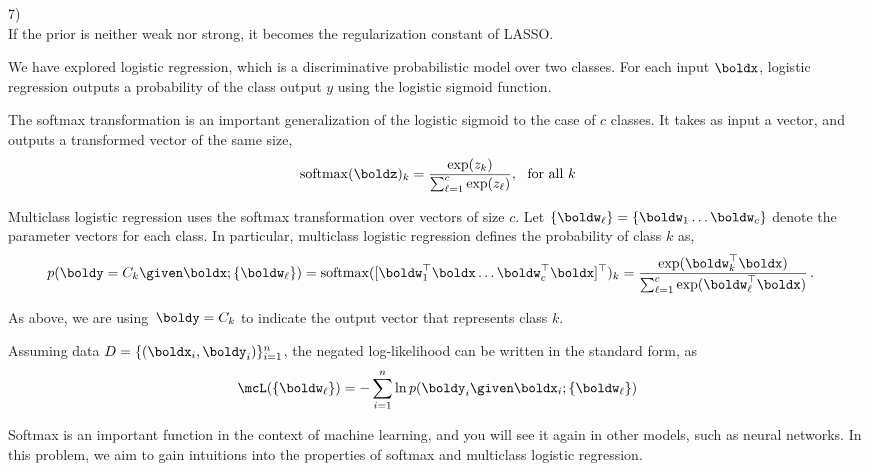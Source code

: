 \documentclass[submit]{harvardml}
\begin{document}
7)\\
If the prior is neither weak nor strong, it becomes the regularization constant of LASSO.




\newpage
\begin{problem}
%
  We have explored logistic regression, which is a discriminative
  probabilistic model over two classes. For each input $\boldx$,
  logistic regression outputs a probability of the class output $y$
  using the logistic sigmoid function.

  The softmax transformation is an important generalization of the logistic
  sigmoid to the case of $c$ classes. It takes as input a vector, and
  outputs a transformed vector of the same size,
%
  \[ \mathrm{softmax}(\boldz)_k =\frac{\exp(z_k)}{\sum_{\ell=1}^c \exp(z_{\ell})}, \ \ \text{for all $k$}\]

Multiclass logistic regression uses the softmax transformation over vectors of size $c$. Let $\{\boldw_{\ell}\} = \{\boldw_1 \ldots \boldw_c \} $
denote the parameter vectors for each class.
In particular,  multiclass logistic regression 
defines the probability of class $k$ as,
%
\begin{align*}
  p(\boldy=C_k \given \boldx; \{\boldw_{\ell}\})
  &= \mathrm{softmax}([\boldw_1^{\top}\boldx \ldots \boldw_c^{\top} \boldx]^\top)_k =  \frac{ \exp( \boldw_k^{\top}\boldx ) }
  {  \sum_{\ell=1}^c \exp( \boldw_{\ell}^{\top}\boldx ) }\,.
\end{align*}

\noindent  As above, we are
using~$\boldy = {C_{k}}$ to indicate the output 
vector that represents class $k$.

Assuming data $D = \{(\boldx_i, \boldy_i)\}_{i=1}^n$,
the negated log-likelihood  can be written in the standard form, as
%
\[\mcL(\{\boldw_{\ell}\}) = - \sum_{i=1}^n \ln  p(\boldy_i \given \boldx_i; \{\boldw_{\ell}\}) \]


Softmax is an important function in the context of machine learning,
and you will see it again in other models, such as neural networks.
In this problem, we aim to gain intuitions into the properties of
softmax and multiclass logistic regression.


\end{problem}
\end{document}
